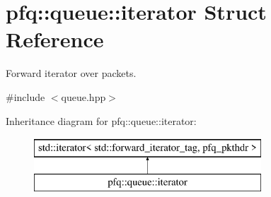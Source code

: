 \hypertarget{structpfq_1_1queue_1_1iterator}{\section{pfq\+:\+:queue\+:\+:iterator Struct Reference}
\label{structpfq_1_1queue_1_1iterator}
}


Forward iterator over packets.  




{\ttfamily \#include $<$queue.\+hpp$>$}

Inheritance diagram for pfq\+:\+:queue\+:\+:iterator\+:\begin{figure}[H]
\begin{center}
\leavevmode
\includegraphics[height=2.000000cm]{structpfq_1_1queue_1_1iterator}
\end{center}
\end{figure}
